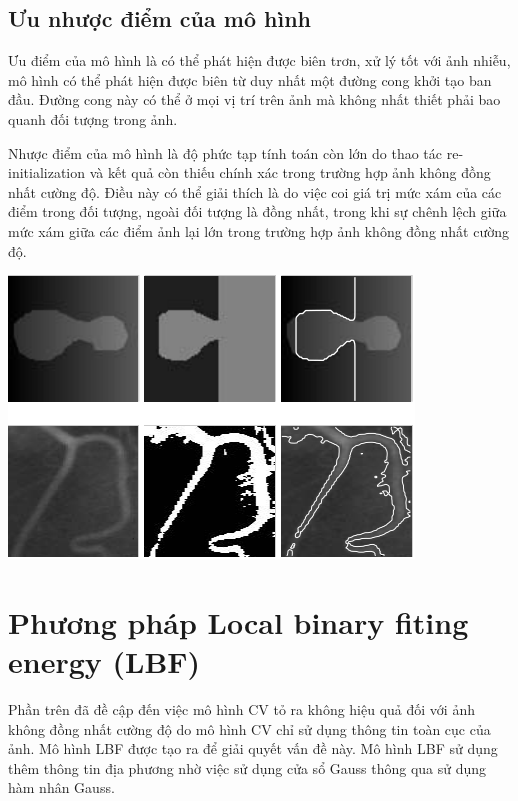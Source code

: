 \documentclass[12pt, oneside, a4paper]{book}
\begin{document}
\subsection{Ưu nhược điểm của mô hình}
\hspace{0.5cm}Ưu điểm của mô hình là có thể phát hiện được biên trơn, xử lý tốt với ảnh nhiễu, mô hình có thể phát hiện được biên từ duy nhất một đường cong khởi tạo ban đầu. Đường cong này có thể ở mọi vị trí trên ảnh mà không nhất thiết phải bao quanh đối tượng trong ảnh.

Nhược điểm của mô hình  là độ phức tạp tính toán còn lớn do thao tác re-initialization và kết quả còn thiếu chính xác trong trường hợp ảnh không đồng nhất cường độ. Điều này có thể giải thích là do việc coi giá trị mức xám của các điểm trong đối tượng, ngoài đối tượng là đồng nhất, trong khi sự chênh lệch giữa mức xám giữa các điểm ảnh lại lớn trong trường hợp ảnh không đồng nhất cường độ.

\begin{center}
\includegraphics[]{figure/mistake.png}
\end{center}

\section{Phương pháp Local binary fiting energy (LBF)}
Phần trên đã đề cập đến việc mô hình CV tỏ ra không hiệu quả đối với ảnh không đồng nhất cường độ do mô hình CV chỉ sử dụng thông tin toàn cục của ảnh. Mô hình LBF được tạo ra để giải quyết vấn đề này. Mô hình LBF sử dụng thêm thông tin địa phương nhờ việc sử dụng cửa sổ Gauss thông qua sử dụng hàm nhân Gauss.
\end{document}
